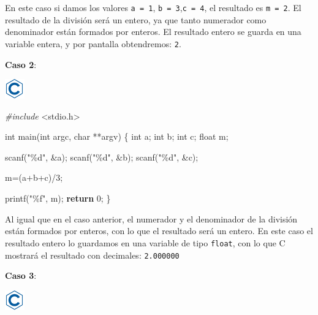 \documentclass[
]{book}
\newenvironment{Shaded}{\begin{snugshade}}{\end{snugshade}}
\newcommand{\ControlFlowTok}[1]{\textcolor[rgb]{0.13,0.29,0.53}{\textbf{#1}}}
\newcommand{\DataTypeTok}[1]{\textcolor[rgb]{0.13,0.29,0.53}{#1}}
\newcommand{\DecValTok}[1]{\textcolor[rgb]{0.00,0.00,0.81}{#1}}
\newcommand{\ImportTok}[1]{#1}
\newcommand{\NormalTok}[1]{#1}
\newcommand{\PreprocessorTok}[1]{\textcolor[rgb]{0.56,0.35,0.01}{\textit{#1}}}
\newcommand{\StringTok}[1]{\textcolor[rgb]{0.31,0.60,0.02}{#1}}
\begin{document}
En este caso si damos los valores \texttt{a\ =\ 1}, \texttt{b\ =\ 3},\texttt{c\ =\ 4}, el resultado es \texttt{m\ =\ 2}. El resultado de la división será un entero, ya que tanto numerador como denominador están formados por enteros. El resultado entero se guarda en una variable entera, y por pantalla obtendremos: \texttt{2}.

\textbf{Caso 2}:

\includegraphics{./img/c.png}

\begin{Shaded}
\begin{Highlighting}[]
\PreprocessorTok{\#include }\ImportTok{\textless{}stdio.h\textgreater{}}

\DataTypeTok{int}\NormalTok{ main(}\DataTypeTok{int}\NormalTok{ argc, }\DataTypeTok{char}\NormalTok{ **argv) \{}
    \DataTypeTok{int}\NormalTok{ a;}
    \DataTypeTok{int}\NormalTok{ b;}
    \DataTypeTok{int}\NormalTok{ c;}
    \DataTypeTok{float}\NormalTok{ m;}

\NormalTok{    scanf(}\StringTok{"\%d"}\NormalTok{, \&a);}
\NormalTok{    scanf(}\StringTok{"\%d"}\NormalTok{, \&b);}
\NormalTok{    scanf(}\StringTok{"\%d"}\NormalTok{, \&c);}

\NormalTok{    m=(a+b+c)/}\DecValTok{3}\NormalTok{;}

\NormalTok{    printf(}\StringTok{"\%f"}\NormalTok{, m);}
    \ControlFlowTok{return} \DecValTok{0}\NormalTok{;}
\NormalTok{\}}
\end{Highlighting}
\end{Shaded}

Al igual que en el caso anterior, el numerador y el denominador de la división están formados por enteros, con lo que el resultado será un entero. En este caso el resultado entero lo guardamos en una variable de tipo \texttt{float}, con lo que C mostrará el resultado con decimales: \texttt{2.000000}

\textbf{Caso 3}:

\includegraphics{./img/c.png}
\end{document}
